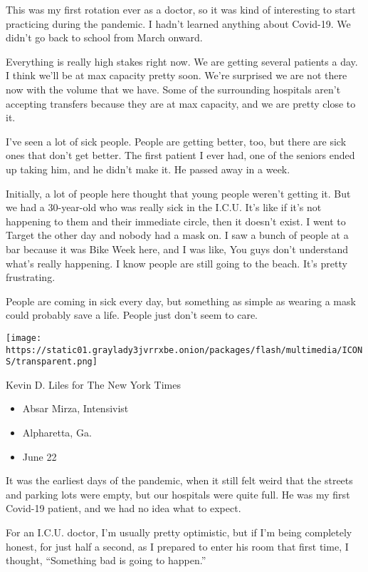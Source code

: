 This was my first rotation ever as a doctor, so it was kind of
interesting to start practicing during the pandemic. I hadn't learned
anything about Covid-19. We didn't go back to school from March onward.

Everything is really high stakes right now. We are getting several
patients a day. I think we'll be at max capacity pretty soon. We're
surprised we are not there now with the volume that we have. Some of the
surrounding hospitals aren't accepting transfers because they are at max
capacity, and we are pretty close to it.

I've seen a lot of sick people. People are getting better, too, but
there are sick ones that don't get better. The first patient I ever had,
one of the seniors ended up taking him, and he didn't make it. He passed
away in a week.

Initially, a lot of people here thought that young people weren't
getting it. But we had a 30-year-old who was really sick in the I.C.U.
It's like if it's not happening to them and their immediate circle, then
it doesn't exist. I went to Target the other day and nobody had a mask
on. I saw a bunch of people at a bar because it was Bike Week here, and
I was like, You guys don't understand what's really happening. I know
people are still going to the beach. It's pretty frustrating.

People are coming in sick every day, but something as simple as wearing
a mask could probably save a life. People just don't seem to care.

\texttt{[image: https://static01.graylady3jvrrxbe.onion/packages/flash/multimedia/ICONS/transparent.png]}

Kevin D. Liles for The New York Times

\begin{itemize}
\tightlist
\item
  Absar Mirza, Intensivist
\item
  Alpharetta, Ga.
\item
  June 22
\end{itemize}

It was the earliest days of the pandemic, when it still felt weird that
the streets and parking lots were empty, but our hospitals were quite
full. He was my first Covid-19 patient, and we had no idea what to
expect.

For an I.C.U. doctor, I'm usually pretty optimistic, but if I'm being
completely honest, for just half a second, as I prepared to enter his
room that first time, I thought, ``Something bad is going to happen.''

